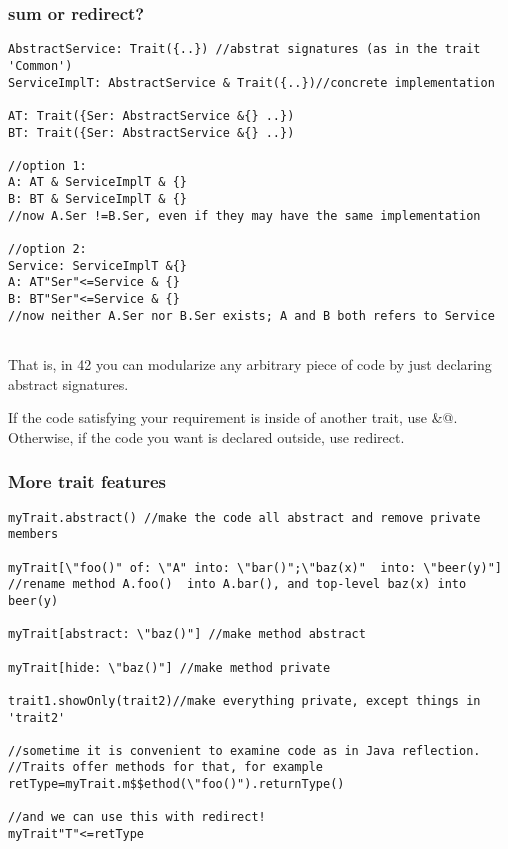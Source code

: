 %

\begin{frame}[fragile]
\frametitle{ sum or redirect?}
\begin{NiceCode}{59ex}{0.7}
\begin{lstlisting}
AbstractService: Trait({..}) //abstrat signatures (as in the trait 'Common')
ServiceImplT: AbstractService & Trait({..})//concrete implementation

AT: Trait({Ser: AbstractService &{} ..})
BT: Trait({Ser: AbstractService &{} ..})

//option 1: 
A: AT & ServiceImplT & {}
B: BT & ServiceImplT & {}
//now A.Ser !=B.Ser, even if they may have the same implementation

//option 2: 
Service: ServiceImplT &{}
A: AT"Ser"<=Service & {}
B: BT"Ser"<=Service & {}
//now neither A.Ser nor B.Ser exists; A and B both refers to Service 


\end{lstlisting}
\end{NiceCode}
That is, in 42 you can modularize any arbitrary piece of code by
just declaring abstract signatures.


If the code satisfying your requirement is inside of another trait, use \Q@&@.
Otherwise, if the code you want is declared outside, use redirect. 


\end{frame}

\begin{frame}[fragile]
\frametitle{More trait features}
\begin{NiceCode}{59ex}{0.7}
\begin{lstlisting}
myTrait.abstract() //make the code all abstract and remove private members

myTrait[\"foo()" of: \"A" into: \"bar()";\"baz(x)"  into: \"beer(y)"]
//rename method A.foo()  into A.bar(), and top-level baz(x) into beer(y)

myTrait[abstract: \"baz()"] //make method abstract

myTrait[hide: \"baz()"] //make method private

trait1.showOnly(trait2)//make everything private, except things in 'trait2'

//sometime it is convenient to examine code as in Java reflection.
//Traits offer methods for that, for example
retType=myTrait.m$$ethod(\"foo()").returnType()

//and we can use this with redirect!
myTrait"T"<=retType

\end{lstlisting}
\end{NiceCode}
\end{frame}


